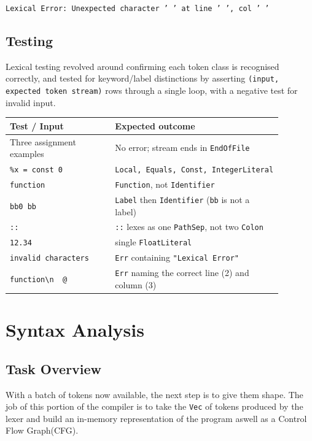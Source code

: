 \documentclass[11pt,a4paper,oneside]{report}
\begin{document}
	\begin{center}
	\texttt{Lexical Error: Unexpected character ' ' at line ' ', col ' '}
	\end{center}
	
	
	\section{Testing}
	
	\begin{testbox}
	Lexical testing revolved around confirming each token class is recognised
	correctly, and tested for keyword/label distinctions by
	asserting \texttt{(input, expected token stream)} rows through a single loop,
	with a negative test for invalid input.
	\end{testbox}
	
	\begin{longtable}{p{0.34\linewidth}p{0.54\linewidth}}
		\toprule
		\textbf{Test / Input} & \textbf{Expected outcome} \\
		\midrule
		\endhead
		Three assignment examples        & No error; stream ends in \texttt{EndOfFile} \\
		\midrule
		\texttt{\%x = const 0}          & \texttt{Local, Equals, Const, IntegerLiteral} \\
		\midrule
		\texttt{function}                & \texttt{Function}, not \texttt{Identifier} \\
		\midrule
		\texttt{bb0 bb}                  & \texttt{Label} then \texttt{Identifier} (\texttt{bb} is not a label) \\
		\midrule
		\texttt{::}       				& \texttt{::} lexes as one \texttt{PathSep}, not two \texttt{Colon}  \\
		\midrule
		\texttt{12.34}                   & single \texttt{FloatLiteral} \\
		\midrule
		\texttt{invalid characters}      & \texttt{Err} containing \texttt{"Lexical Error"} \\
		\midrule
		\texttt{function\textbackslash n~~@} & \texttt{Err} naming the correct line (2) and column (3) \\
		\bottomrule
	\end{longtable}
		
	
	\chapter{Syntax Analysis}
	
	\section{Task Overview}
	With a batch of tokens now available, the next step is to give them shape. The job of this portion of the compiler is to take the \texttt{Vec} of tokens produced by the lexer and build an in-memory representation of the program aswell as a Control Flow Graph(CFG). 
	
\end{document}
